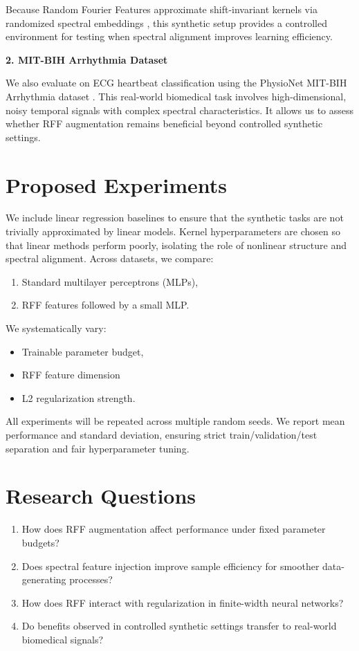 \documentclass[11pt]{article}
\begin{document}
Because Random Fourier Features approximate shift-invariant kernels via randomized spectral embeddings \cite{rahimi2007}, this synthetic setup provides a controlled environment for testing when spectral alignment improves learning efficiency.

\textbf{2. MIT-BIH Arrhythmia Dataset}

We also evaluate on ECG heartbeat classification using the PhysioNet MIT-BIH Arrhythmia dataset \cite{moody2001}. This real-world biomedical task involves high-dimensional, noisy temporal signals with complex spectral characteristics. It allows us to assess whether RFF augmentation remains beneficial beyond controlled synthetic settings.

\section{Proposed Experiments}

We include linear regression baselines to ensure that the synthetic tasks are not trivially approximated by linear models. Kernel hyperparameters are chosen so that linear methods perform poorly, isolating the role of nonlinear structure and spectral alignment. Across datasets, we compare:

\begin{enumerate}
    \item Standard multilayer perceptrons (MLPs),
    \item RFF features followed by a small MLP.
\end{enumerate}

We systematically vary:
\begin{itemize}
    \item Trainable parameter budget,
    \item RFF feature dimension
    \item L2 regularization strength.
\end{itemize}

All experiments will be repeated across multiple random seeds. We report mean performance and standard deviation, ensuring strict train/validation/test separation and fair hyperparameter tuning.

\section{Research Questions}

\begin{enumerate}
    \item How does RFF augmentation affect performance under fixed parameter budgets?
    \item Does spectral feature injection improve sample efficiency for smoother data-generating processes?
    \item How does RFF interact with regularization in finite-width neural networks?
    \item Do benefits observed in controlled synthetic settings transfer to real-world biomedical signals?
\end{enumerate}
\end{document}
